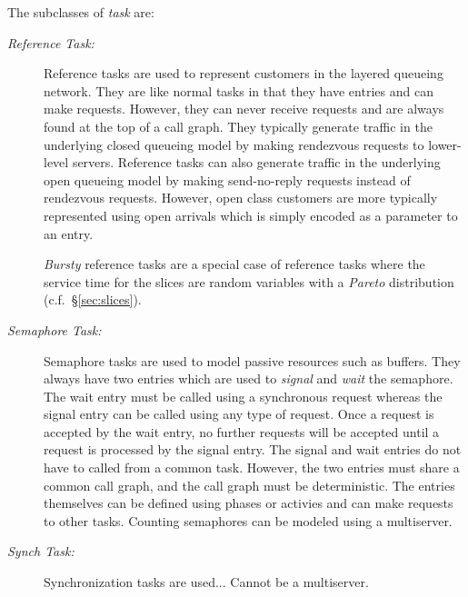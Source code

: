 The subclasses of \emph{task} are:
\begin{description}
\item[\emph{Reference Task:}] Reference tasks are used to
  represent customers in the layered queueing network.  They are like normal tasks in that
  they have entries and can make requests.  However, they can never receive requests and are always found at
  the top of a call graph.  They typically generate traffic in the underlying closed queueing
  model by making rendezvous requests to
  lower-level servers.  Reference tasks can also generate traffic in the underlying open queueing
  model by making send-no-reply requests instead of rendezvous requests.
  However, open class customers are more typically represented using open arrivals which is simply encoded
  as a parameter to an entry.
  
  \emph{Bursty} reference tasks are
  a special case of reference tasks where the service time for the slices are random variables
  with a \emph{Pareto} distribution (c.f.~\S\ref{sec:slices}).
\item[\emph{Semaphore Task:}] Semaphore tasks are used to
  model passive resources such as buffers.  They always have two entries which are
  used to \emph{signal} and \emph{wait} the
  semaphore.  The wait entry must be called using a synchronous request whereas the signal entry can be
  called using any type of request.  Once a request is accepted by the wait entry, no further requests will
  be accepted until a request is processed by the signal entry.  The signal and wait entries do not have to
  called from a common task.  However, the two entries must share a common call graph, and the call graph
  must be deterministic.  The entries themselves can be defined using phases or activies and can make
  requests to other tasks.  Counting semaphores can be modeled using a
  multiserver.
\item[\emph{Synch Task:}] Synchronization tasks
   are used...  Cannot be a multiserver.
\end{description}


